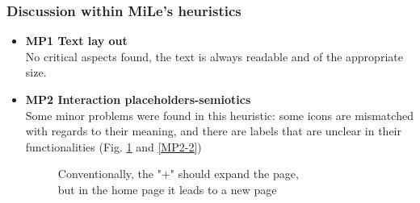 \subsubsection{Discussion within MiLe's heuristics}
\begin{itemize}
    \item \textbf{MP1 Text lay out}\\
        No critical aspects found, the text is always readable and of the appropriate size.\\
    \item \textbf{MP2 Interaction placeholders-semiotics}\\
        Some minor problems were found in this heuristic: some icons are mismatched with regards to their meaning, and there are labels that are unclear in their functionalities (Fig. \ref{MP2-1} and \ref{MP2-2})
        \begin{figure}[!ht]
            \begin{minipage}{\linewidth}
                \centering
                \captionsetup{justification=centering}
                \caption{Conventionally, the "+" should expand the page,\\
                but in the home page it leads to a new page}
                \label{MP2-1}
            \end{minipage}
        \end{figure}
        \begin{figure}[!ht]
            \begin{minipage}{\linewidth}
                \centering

\end{minipage}
\end{figure}
\end{itemize}
